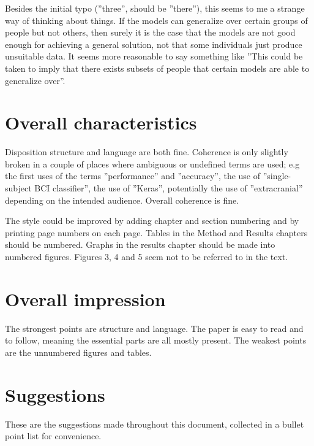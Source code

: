 \documentclass[a4paper,12pt]{article}
\begin{document}
\label{strangethink}
\noindent
Besides the initial typo (''three'', should be ''there''), this seems to me a strange way of
thinking about things. If the models can generalize over
certain groups of people but not others, then surely it is the case that the models are
not good enough for achieving a general solution, not that some individuals just produce
unsuitable data. It seems more reasonable to say something like ''This could be taken
to imply that there exists subsets of people that certain models are able to generalize over''.

\section{Overall characteristics}
Disposition structure and language are both fine. Coherence is only slightly
broken in a couple of places where ambiguous or undefined terms are used; e.g the first uses of the
terms ''performance'' and ''accuracy'', the use of ''single-subject BCI classifier'', the
use of ''Keras'', potentially the use of ''extracranial'' depending on the intended audience. Overall
coherence is fine.

The style could be improved by adding chapter and section numbering and by printing page numbers
on each page. Tables in the Method and Results chapters should be numbered. Graphs in the results
chapter should be made into numbered figures. Figures 3, 4 and 5 seem not to be referred to in the
text.

\section{Overall impression}
The strongest points are structure and language. The paper is easy to read and to follow, meaning
the essential parts are all mostly present. The weakest points are the unnumbered figures and tables.

\section{Suggestions}
These are the suggestions made throughout this document, collected in a bullet point list
for convenience.
\end{document}
